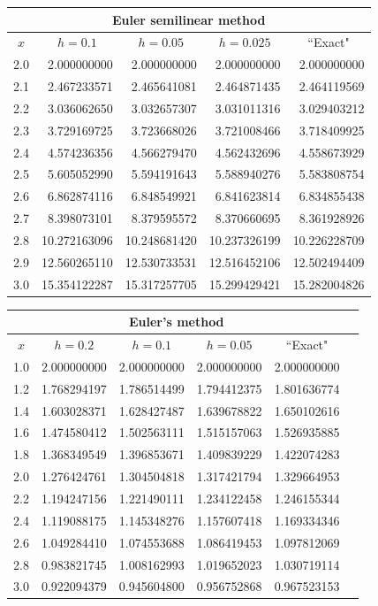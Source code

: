 \documentclass[dvips]{book}
\renewcommand{\exer}[1]{\par\medskip\;\noindent{\color{red}\bf #1.}}
\numberwithin{example}{section}
\numberwithin{equation}{section}
\numberwithin{theorem}{section}
\numberwithin{table}{section}
\numberwithin{figure}{section}
\begin{document}
{\small
\begin{tabular}{|c|r|r|r|r|}
\hline
\multicolumn{5}{|c|}{Euler semilinear method}\\\hline
\multicolumn{1}{|c|}{$x$}&
\multicolumn{1}{|c|}{$h=0.1$}&
\multicolumn{1}{|c|}{$h=0.05$}&
\multicolumn{1}{|c|}{$h=0.025$}&
\multicolumn{1}{|c|}{``Exact"}\\ \hline
2.0 &  2.000000000 &  2.000000000 &  2.000000000 &  2.000000000 \\
2.1 &  2.467233571 &  2.465641081 &  2.464871435 &  2.464119569 \\
2.2 &  3.036062650 &  3.032657307 &  3.031011316 &  3.029403212 \\
2.3 &  3.729169725 &  3.723668026 &  3.721008466 &  3.718409925 \\
2.4 &  4.574236356 &  4.566279470 &  4.562432696 &  4.558673929 \\
2.5 &  5.605052990 &  5.594191643 &  5.588940276 &  5.583808754 \\
2.6 &  6.862874116 &  6.848549921 &  6.841623814 &  6.834855438 \\
2.7 &  8.398073101 &  8.379595572 &  8.370660695 &  8.361928926 \\
2.8 & 10.272163096 & 10.248681420 & 10.237326199 & 10.226228709 \\
2.9 & 12.560265110 & 12.530733531 & 12.516452106 & 12.502494409 \\
3.0 & 15.354122287 & 15.317257705 & 15.299429421 & 15.282004826 \\
\hline
\end{tabular}}


\exer{3.1.16}
{\small
\begin{tabular}{|c|r|r|r|r|r|}
\hline
\multicolumn{5}{|c|}{Euler's method}\\\hline
\multicolumn{1}{|c|}{$x$}&
\multicolumn{1}{|c|}{$h=0.2$}&
\multicolumn{1}{|c|}{$h=0.1$}&
\multicolumn{1}{|c|}{$h=0.05$}&
\multicolumn{1}{|c|}{``Exact"}\\ \hline
1.0 & 2.000000000 & 2.000000000 & 2.000000000 & 2.000000000 \\
1.2 & 1.768294197 & 1.786514499 & 1.794412375 & 1.801636774 \\
1.4 & 1.603028371 & 1.628427487 & 1.639678822 & 1.650102616 \\
1.6 & 1.474580412 & 1.502563111 & 1.515157063 & 1.526935885 \\
1.8 & 1.368349549 & 1.396853671 & 1.409839229 & 1.422074283 \\
2.0 & 1.276424761 & 1.304504818 & 1.317421794 & 1.329664953 \\
2.2 & 1.194247156 & 1.221490111 & 1.234122458 & 1.246155344 \\
2.4 & 1.119088175 & 1.145348276 & 1.157607418 & 1.169334346 \\
2.6 & 1.049284410 & 1.074553688 & 1.086419453 & 1.097812069 \\
2.8 & 0.983821745 & 1.008162993 & 1.019652023 & 1.030719114 \\
3.0 & 0.922094379 & 0.945604800 & 0.956752868 & 0.967523153 \\
\hline
\end{tabular}}
\end{document}
